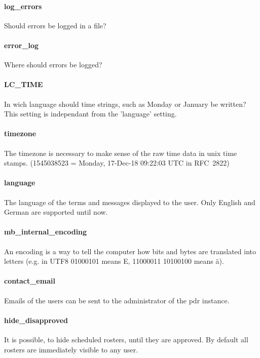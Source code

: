 \paragraph{log\_errors}
Should errors be logged in a file?
\paragraph{error\_log}
Where should errors be logged?
\paragraph{LC\_TIME}
In wich language should time strings, such as Monday or January be written? This setting is independant from the 'language' setting.
\paragraph{timezone}
The timezone is necessary to make sense of the raw time data in unix time stamps. (1545038523 = Monday, 17-Dec-18 09:22:03 UTC in RFC~2822)
\paragraph{language}
The language of the terms and messages displayed to the user. Only English and German are supported until now.
\paragraph{mb\_internal\_encoding}
An encoding is a way to tell the computer how bits and bytes are translated into letters (e.g. in UTF8 01000101 means E, 11000011 10100100 means ä). 
\paragraph{contact\_email}
Emails of the users can be sent to the administrator of the pdr instance.
\paragraph{hide\_disapproved}
It is possible, to hide scheduled rosters, until they are approved. By default all rosters are immediately visible to any user.
